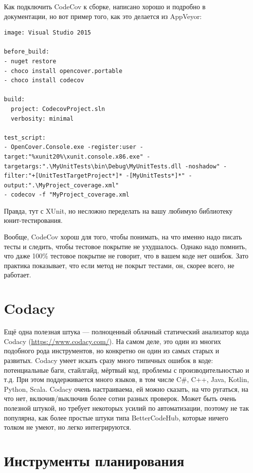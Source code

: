 \documentclass[a5paper]{article}
\begin{document}
Как подключить CodeCov к сборке, написано хорошо и подробно в документации, но вот пример того, как это делается из AppVeyor:

\begin{verbatim}
image: Visual Studio 2015

before_build:
- nuget restore
- choco install opencover.portable
- choco install codecov

build:
  project: CodecovProject.sln
  verbosity: minimal

test_script:
- OpenCover.Console.exe -register:user -target:"%xunit20%\xunit.console.x86.exe" -targetargs:".\MyUnitTests\bin\Debug\MyUnitTests.dll -noshadow" -filter:"+[UnitTestTargetProject*]* -[MyUnitTests*]*" -output:".\MyProject_coverage.xml"
- codecov -f "MyProject_coverage.xml
\end{verbatim}

Правда, тут с XUnit, но несложно переделать на вашу любимую библиотеку юнит-тестирования.

Вообще, CodeCov хорош для того, чтобы понимать, на что именно надо писать тесты и следить, чтобы тестовое покрытие не ухудшалось. Однако надо помнить, что даже 100\% тестовое покрытие не говорит, что в вашем коде нет ошибок. Зато практика показывает, что если метод не покрыт тестами, он, скорее всего, не работает.

\section{Codacy}

Ещё одна полезная штука --- полноценный облачный статический анализатор кода Codacy (\url{https://www.codacy.com/}). На самом деле, это один из многих подобного рода инструментов, но конкретно он один из самых старых и развитых. Codacy умеет искать сразу много типичных ошибок в коде: потенциальные баги, стайлгайд, мёртвый код, проблемы с производительностью и т.д. При этом поддерживается много языков, в том числе C\#, C++, Java, Kotlin, Python, Scala. Codacy очень настраиваема, ей можно сказать, на что ругаться, на что нет, включив/выключив более сотни разных проверок. Может быть очень полезной штукой, но требует некоторых усилий по автоматизации, поэтому не так популярна, как более простые штуки типа BetterCodeHub, которые ничего толком не умеют, но легко интегрируются.

\section{Инструменты планирования}
\end{document}
